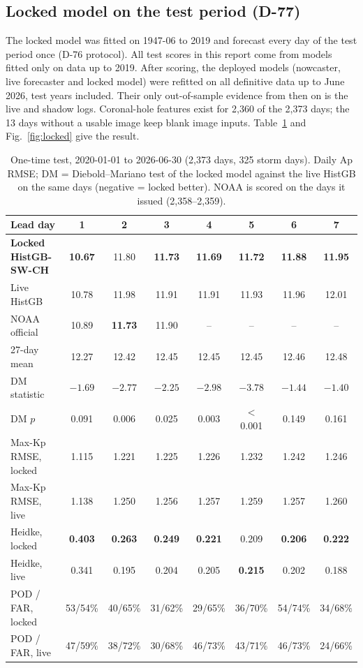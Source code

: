 \documentclass[11pt,a4paper]{article}
\begin{document}
\subsection{Locked model on the test period (D-77)}
The locked model was fitted on 1947-06 to 2019 and forecast every day of the test period once (D-76 protocol).
All test scores in this report come from models fitted only on data up to 2019. After scoring, the deployed models
(nowcaster, live forecaster and locked model) were refitted on all definitive data up to June 2026, test years
included. Their only out-of-sample evidence from then on is the live and shadow logs.
Coronal-hole features exist for 2{,}360 of the 2{,}373 days; the 13 days without a usable image keep blank image
inputs. Table~\ref{tab:locked} and Fig.~\ref{fig:locked} give the result.

\begin{table}[htbp]\centering\small
\caption{One-time test, 2020-01-01 to 2026-06-30 (2,373 days, 325 storm days). Daily Ap RMSE; DM = Diebold--Mariano
test of the locked model against the live HistGB on the same days (negative = locked better). NOAA is scored on the
days it issued (2,358--2,359).}\label{tab:locked}
\setlength{\tabcolsep}{5pt}
\begin{tabular}{@{}lccccccc@{}}\toprule
Lead day & 1 & 2 & 3 & 4 & 5 & 6 & 7\\\midrule
\textbf{Locked HistGB-SW-CH} & \textbf{10.67} & 11.80 & \textbf{11.73} & \textbf{11.69} & \textbf{11.72} & \textbf{11.88} & \textbf{11.95}\\
Live HistGB & 10.78 & 11.98 & 11.91 & 11.91 & 11.93 & 11.96 & 12.01\\
NOAA official & 10.89 & \textbf{11.73} & 11.90 & -- & -- & -- & --\\
27-day mean & 12.27 & 12.42 & 12.45 & 12.45 & 12.45 & 12.46 & 12.48\\\midrule
DM statistic & $-1.69$ & $-2.77$ & $-2.25$ & $-2.98$ & $-3.78$ & $-1.44$ & $-1.40$\\
DM $p$ & 0.091 & 0.006 & 0.025 & 0.003 & $<$0.001 & 0.149 & 0.161\\\midrule
Max-Kp RMSE, locked & 1.115 & 1.221 & 1.225 & 1.226 & 1.232 & 1.242 & 1.246\\
Max-Kp RMSE, live & 1.138 & 1.250 & 1.256 & 1.257 & 1.259 & 1.257 & 1.260\\\midrule
Heidke, locked & \textbf{0.403} & \textbf{0.263} & \textbf{0.249} & \textbf{0.221} & 0.209 & \textbf{0.206} & \textbf{0.222}\\
Heidke, live & 0.341 & 0.195 & 0.204 & 0.205 & \textbf{0.215} & 0.202 & 0.188\\
POD / FAR, locked & 53/54\% & 40/65\% & 31/62\% & 29/65\% & 36/70\% & 54/74\% & 34/68\%\\
POD / FAR, live & 47/59\% & 38/72\% & 30/68\% & 46/73\% & 43/71\% & 46/73\% & 24/66\%\\\bottomrule
\end{tabular}
\end{table}
\end{document}
